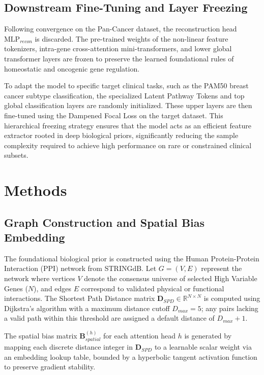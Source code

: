 \documentclass[10pt, twocolumn]{article}
\begin{document}
\subsection{Downstream Fine-Tuning and Layer Freezing}

Following convergence on the Pan-Cancer dataset, the reconstruction head $\text{MLP}_{recon}$ is discarded. The pre-trained weights of the non-linear feature tokenizers, intra-gene cross-attention mini-transformers, and lower global transformer layers are frozen to preserve the learned foundational rules of homeostatic and oncogenic gene regulation. 

To adapt the model to specific target clinical tasks, such as the PAM50 breast cancer subtype classification, the specialized Latent Pathway Tokens and top global classification layers are randomly initialized. These upper layers are then fine-tuned using the Dampened Focal Loss on the target dataset. This hierarchical freezing strategy ensures that the model acts as an efficient feature extractor rooted in deep biological priors, significantly reducing the sample complexity required to achieve high performance on rare or constrained clinical subsets.


\section*{Methods}

\subsection*{Graph Construction and Spatial Bias Embedding}
The foundational biological prior is constructed using the Human Protein-Protein Interaction (PPI) network from STRINGdB. Let $G = (V, E)$ represent the network where vertices $V$ denote the consensus universe of selected High Variable Genes ($N$), and edges $E$ correspond to validated physical or functional interactions. The Shortest Path Distance matrix $\mathbf{D}_{SPD} \in \mathbb{R}^{N \times N}$ is computed using Dijkstra's algorithm with a maximum distance cutoff $D_{max} = 5$; any pairs lacking a valid path within this threshold are assigned a default distance of $D_{max} + 1$. 

The spatial bias matrix $\mathbf{B}_{spatial}^{(h)}$ for each attention head $h$ is generated by mapping each discrete distance integer in $\mathbf{D}_{SPD}$ to a learnable scalar weight via an embedding lookup table, bounded by a hyperbolic tangent activation function to preserve gradient stability.
\end{document}
